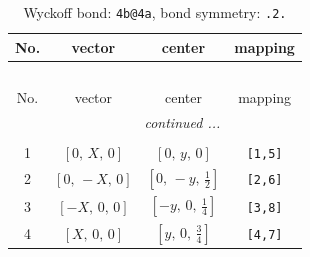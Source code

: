 \documentclass[fleqn,8pt]{jsarticle}
\begin{document}
\begin{longtable}{cccc}
\caption{Wyckoff bond: {\tt 4b@4a}, bond symmetry: {\tt .2.}}
 \\
 \hline \hline
No. & vector & center & mapping \\ \hline \endfirsthead

\multicolumn{3}{l}{\tablename\ \thetable{}} \\
 \hline \hline
No. & vector & center & mapping \\ \hline \endhead

 \hline \hline
\multicolumn{3}{r}{\footnotesize\it continued ...} \\ \endfoot

 \hline \hline
\multicolumn{3}{r}{} \\ \endlastfoot

1 & $\left[ 0,\, X,\, 0 \right]$ & $\left[ 0,\, y,\, 0 \right]$ & {\tt [1,5]} \\ \hline
2 & $\left[ 0,\, - X,\, 0 \right]$ & $\left[ 0,\, - y,\, \frac{1}{2} \right]$ & {\tt [2,6]} \\ \hline
3 & $\left[ - X,\, 0,\, 0 \right]$ & $\left[ - y,\, 0,\, \frac{1}{4} \right]$ & {\tt [3,8]} \\ \hline
4 & $\left[ X,\, 0,\, 0 \right]$ & $\left[ y,\, 0,\, \frac{3}{4} \right]$ & {\tt [4,7]} \\
\end{longtable}
\renewcommand{\arraystretch}{1.2}
\end{document}
